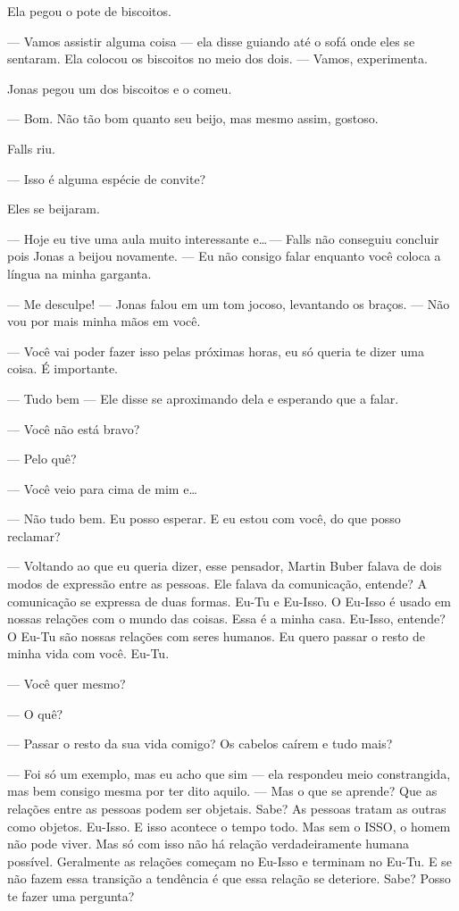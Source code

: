 Ela pegou o pote de biscoitos.

--- Vamos assistir alguma coisa --- ela disse\mudanca{,} guiando até o sofá\mudanca{,} onde eles se sentaram. Ela colocou os biscoitos no meio dos dois. --- Vamos, experimenta.

Jonas pegou um dos biscoitos e o comeu.

--- Bom. Não tão bom quanto seu beijo, mas mesmo assim, gostoso.

Falls riu.

--- Isso é alguma espécie de convite?

Eles se beijaram.

--- Hoje eu tive uma aula muito interessante e\ldots\,--- Falls não conseguiu concluir\mudanca{,} pois Jonas a beijou novamente. --- Eu não consigo falar enquanto você coloca a língua na minha garganta.

--- Me desculpe! --- Jonas falou em um tom jocoso, levantando os braços. --- Não vou por mais minha mãos em você.

--- Você vai poder fazer isso pelas próximas horas, eu só queria te dizer uma coisa. É importante.

--- Tudo bem --- Ele disse\mudanca{,} se aproximando dela e esperando que  a falar.

--- Você não está bravo?

--- Pelo quê?

--- Você veio para cima de mim e\ldots

--- Não\mudanca{,} tudo bem. Eu posso esperar. E eu estou com você, do que posso reclamar?

--- Voltando ao que eu queria dizer, esse pensador, Martin Buber\mudanca{,} falava de dois modos de expressão entre as pessoas. Ele falava da comunicação, entende? A comunicação se expressa de duas formas. Eu-Tu e Eu-Isso. O Eu-Isso é usado em nossas relações com o mundo das coisas. Essa é a minha casa. Eu-Isso, entende? O Eu-Tu são nossas relações com seres humanos. Eu quero passar o resto de minha vida com você. Eu-Tu.

--- Você quer mesmo?

--- O quê?

--- Passar o resto da sua vida comigo? Os cabelos caírem e tudo mais?

--- Foi só um exemplo, mas eu acho que sim --- ela respondeu\mudanca{,} meio constrangida, mas bem consigo mesma por ter dito aquilo. --- Mas o que se aprende? Que as relações entre as pessoas podem ser objetais. Sabe? As pessoas tratam as outras como objetos. Eu-Isso. E isso acontece o tempo todo. Mas sem o ISSO, o homem não pode viver. Mas só com isso não há relação verdadeiramente humana possível. Geralmente as relações começam no Eu-Isso e terminam no Eu-Tu. E se não fazem essa transição a tendência é que essa relação se deteriore. Sabe? Posso te fazer uma pergunta?

